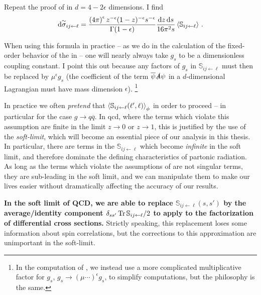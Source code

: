 \begin{exercise}
    \label{ex:d-dimensional-splitting}
    Repeat the proof of  in \(d = 4 - 2\epsilon\) dimensions.
    I find
    \begin{align}
        \dd \overset{\sim}{\sigma}_{ij\leftarrow \ell}
        =
        \frac{\left(4\pi\right)^\epsilon z^{-\epsilon}(1-z)^{-\epsilon} s^{-\epsilon}}{\Gamma(1-\epsilon)}
        \frac{\dd z \, \dd s}{16 \pi^2 s}
        \left\langle\mathbb{S}_{ij\leftarrow \ell}\right\rangle
        \,.
    \end{align}

    When using this formula in practice -- as we do in the calculation of the fixed-order behavior of the  in  -- one will nearly always take \(g_s\) to be a dimensionless coupling constant.
    I point this out because any factors of \(g_s\) in \(\mathbb{S}_{ij \leftarrow \ell}\) must then be replaced by \(\mu^\epsilon g_s\) (the coefficient of the term \(\overline{\psi} \slashed{A} \psi\) in a \(d\)-dimensional Lagrangian must have mass dimension \(\epsilon\)).%
    \footnote{
        In the computation of , we instead use a more complicated multiplicative factor for \(g_s\), \(g_s \to (\mu \cdots)^\epsilon g_s\), to simplify computations, but the philosophy is the same.
    }
\end{exercise}




In practice we often \textit{pretend} that \(
        \left\langle\mathbb{S}_{ij \leftarrow \ell}(\ell', \ell)\right\rangle_\phi
\) in order to proceed -- in particular for the case \(g \to q \overline{q}\).
%
In \gls{qcd}, where the terms which violate this assumption are finite in the limit \(z \to 0\) or \(z \to 1\), this is justified by the use of the \textit{\gls{soft-limit}}, which will become an essential piece of our analysis in this thesis.
%
In particular, there are terms in the \(\mathbb{S}_{ij \leftarrow \ell}\) which become \textit{infinite} in the soft limit, and therefore dominate the defining characteristics of partonic radiation.
%
As long as the terms which violate the assumptions of  are not singular terms, they are sub-leading in the soft limit, and we can manipulate them to make our lives easier without dramatically affecting the accuracy of our results.


\textbf{In the soft limit of QCD, we are able to replace \(\mathbb{S}_{ij \leftarrow \ell}(s, s')\) by the average/identity component \(\delta_{s s'} \Tr \mathbb{S}_{ij \leftarrow \ell}/2\) to apply  to the factorization of differential cross sections.}
%
Strictly speaking, this replacement loses some information about spin correlations, but the corrections to this approximation are unimportant in the \gls{soft-limit}.



